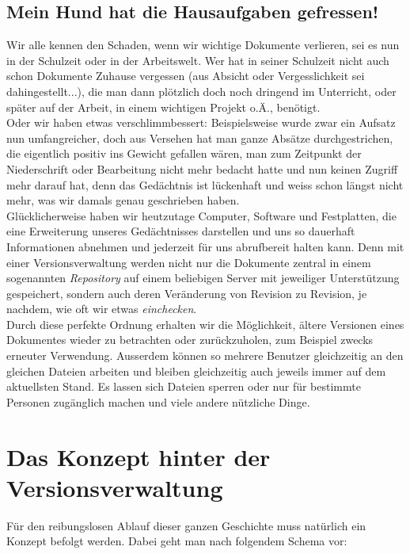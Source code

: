 \documentclass[b5paper,10pt,dvips,fleqn,titlepage,twoside]{book}
\begin{document}
\subsection{Mein Hund hat die Hausaufgaben gefressen!}
Wir alle kennen den Schaden, wenn wir wichtige Dokumente verlieren, sei es nun in der Schulzeit oder in der Arbeitswelt. Wer hat in seiner Schulzeit nicht auch schon Dokumente Zuhause vergessen (aus Absicht oder Vergesslichkeit sei dahingestellt...), die man dann plötzlich doch noch dringend im Unterricht, oder später auf der Arbeit, in einem wichtigen Projekt o.Ä., benötigt.
\\
Oder wir haben etwas verschlimmbessert: Beispielsweise wurde zwar ein Aufsatz nun umfangreicher, doch aus Versehen hat man ganze Absätze durchgestrichen, die eigentlich positiv ins Gewicht gefallen wären, man zum Zeitpunkt der Niederschrift oder Bearbeitung nicht mehr bedacht hatte und nun keinen Zugriff mehr darauf hat, denn das Gedächtnis ist lückenhaft und weiss schon längst nicht mehr, was wir damals genau geschrieben haben.
\\
Glücklicherweise haben wir heutzutage Computer, Software und Festplatten, die eine Erweiterung unseres Gedächtnisses darstellen und uns so dauerhaft Informationen abnehmen und jederzeit für uns abrufbereit halten kann. Denn mit einer Versionsverwaltung werden nicht nur die Dokumente zentral in einem sogenannten \emph{Repository} auf einem beliebigen Server mit jeweiliger Unterstützung gespeichert, sondern auch deren Veränderung von Revision zu Revision, je nachdem, wie oft wir etwas \textit{einchecken}.
\\
 Durch diese perfekte Ordnung erhalten wir die Möglichkeit, ältere Versionen eines Dokumentes wieder zu betrachten oder zurückzuholen, zum Beispiel zwecks erneuter Verwendung. Ausserdem können so mehrere Benutzer gleichzeitig an den gleichen Dateien arbeiten und bleiben gleichzeitig auch jeweils immer auf dem aktuellsten Stand. Es lassen sich Dateien sperren oder nur für bestimmte Personen zugänglich machen und viele andere nützliche Dinge. \newline

\section{Das Konzept hinter der Versionsverwaltung}
Für den reibungslosen Ablauf dieser ganzen Geschichte muss natürlich ein Konzept befolgt werden. Dabei geht man nach folgendem Schema vor:
\end{document}
